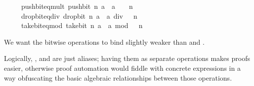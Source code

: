 \begin{isabellebody}
\ \ \ \ \ push{\isacharunderscore}{\kern0pt}bit{\isacharunderscore}{\kern0pt}eq{\isacharunderscore}{\kern0pt}mult{\isacharcolon}{\kern0pt}\ {\isacartoucheopen}push{\isacharunderscore}{\kern0pt}bit\ n\ a\ {\isacharequal}{\kern0pt}\ a\ {\isacharasterisk}{\kern0pt}\ {}\ {\isacharcircum}{\kern0pt}\ n{\isacartoucheclose}\isanewline
\ \ \ \ \ drop{\isacharunderscore}{\kern0pt}bit{\isacharunderscore}{\kern0pt}eq{\isacharunderscore}{\kern0pt}div{\isacharcolon}{\kern0pt}\ {\isacartoucheopen}drop{\isacharunderscore}{\kern0pt}bit\ n\ a\ {\isacharequal}{\kern0pt}\ a\ div\ {}\ {\isacharcircum}{\kern0pt}\ n{\isacartoucheclose}\isanewline
\ \ \ \ \ take{\isacharunderscore}{\kern0pt}bit{\isacharunderscore}{\kern0pt}eq{\isacharunderscore}{\kern0pt}mod{\isacharcolon}{\kern0pt}\ {\isacartoucheopen}take{\isacharunderscore}{\kern0pt}bit\ n\ a\ {\isacharequal}{\kern0pt}\ a\ mod\ {}\ {\isacharcircum}{\kern0pt}\ n{\isacartoucheclose}\isanewline
{}%
\begin{isamarkuptext}%
We want the bitwise operations to bind slightly weaker
  than \isa{{\isacharplus}{\kern0pt}} and \isa{{\isacharminus}{\kern0pt}}.

  Logically, ,
   and  are just aliases; having them
  as separate operations makes proofs easier, otherwise proof automation
  would fiddle with concrete expressions  in a way obfuscating the basic
  algebraic relationships between those operations.


\end{isamarkuptext}
\end{isabellebody}
